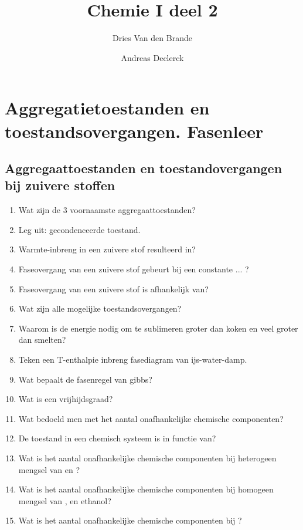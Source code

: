 \documentclass[a4paper,12pt]{article}
\begin{document}
    \title{Chemie I deel 2}
    \author{Dries Van den Brande \and Andreas Declerck}

    \maketitle
    \setcounter{section}{6}
    \section{Aggregatietoestanden en toestandsovergangen. Fasenleer}

    \subsection*{Aggregaattoestanden en toestandovergangen bij zuivere stoffen}
    \begin{enumerate}
        \item Wat zijn de 3 voornaamste aggregaattoestanden?
        \item Leg uit: gecondenceerde toestand.
        \item Warmte-inbreng in een zuivere stof resulteerd in?
        \item Faseovergang van een zuivere stof gebeurt bij een constante ... ? 
        \item Faseovergang van een zuivere stof is afhankelijk van?
        \item Wat zijn alle mogelijke toestandsovergangen?
        \item Waarom is de energie nodig om te sublimeren groter dan koken en veel groter dan smelten?
        \item Teken een T-enthalpie inbreng fasediagram van ijs-water-damp.
        \item Wat bepaalt de fasenregel van gibbs?
        \item Wat is een vrijhijdsgraad?
        \item Wat bedoeld men met het aantal onafhankelijke chemische componenten?
        \item De toestand in een chemisch systeem is in functie van?
        \item Wat is het aantal onafhankelijke chemische componenten bij heterogeen mengsel van  en ?
        \item Wat is het aantal onafhankelijke chemische componenten bij homogeen mengsel van , en ethanol?
        \item Wat is het aantal onafhankelijke chemische componenten bij ?

\end{enumerate}
\end{document}
